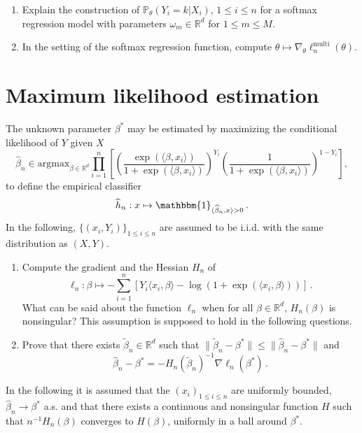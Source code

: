 \documentclass[a4paper,10pt,fleqn]{article}
\newcommand{\eqsp}{\,}
\newcommand{\rset}{\ensuremath{\mathbb{R}}}
\newcommand{\1}{\ensuremath{\mathbbm{1}}}
\begin{document}
\begin{enumerate}
\item Explain the construction of $\mathbb{P}_{\theta}(Y_i = k | X_i)$, $1\leqslant i\leqslant n$ for a softmax regression model with parameters $\omega_m\in\mathbb{R}^d$ for $1\leqslant m  \leqslant M$.
\item In the setting  of the softmax regression function, compute $\theta \mapsto \nabla_\theta \ell^{\mathrm{multi}}_n(\theta)$.
\end{enumerate}


\section{Maximum likelihood estimation}
The unknown parameter $\beta^*$ may be estimated  by maximizing the conditional likelihood of $Y$ given $X$
$$
\widehat \beta_n\in\mathrm{argmax}_{\beta\in\mathbb{R}^{d}}
\prod_{i=1}^n \left[ \left( \frac{\exp\left(\langle
	\beta,x_{i}\rangle\right)}{1+\exp\left(\langle
	\beta,x_{i}\rangle\right)}\right)^{Y_{i}}
\left(\frac{1}{1+\exp\left(\langle
	\beta,x_{i}\rangle\right)}\right)^{1- Y_{i}} \right] ,
$$
to define the empirical classifier
$$
\widehat h_{n}: x \mapsto \1_{\langle \widehat\beta_n,x\rangle>0}\eqsp.
$$
In the following, $\{(x_i,Y_i)\}_{1\leqslant i\leqslant n}$ are assumed to be i.i.d. with the same distribution as $(X,Y)$.
\begin{enumerate}
\item Compute the gradient and the Hessian $H_{n}$ of
$$
\ell_{n}:\beta \mapsto -\sum_{i=1}^n\left[Y_{i}\langle x_{i},\beta\rangle-\log(1+\exp(\langle x_{i},\beta\rangle))\right]\eqsp.
$$
What can be said about the function $\ell_{n}$ when for all $\beta\in\rset^d$, $H_{n}(\beta)$ is nonsingular? This assumption is supposed to hold in the following questions.
\item Prove that there exists $\widetilde \beta_n\in\rset^d$ such that $\|\widetilde \beta_n-\beta^*\|\leq \|\widehat \beta_n-\beta^*\|$ and
$$
\widehat \beta_n-\beta^*=-H_{n}(\widetilde \beta_n)^{-1}\nabla \ell_{n}(\beta^*)\eqsp.
$$
\end{enumerate}
In the following it is assumed that the $(x_{i})_{1\leqslant i\leqslant n}$ are uniformly bounded, $\widehat \beta_n\to \beta^*$ a.s. and that there exists a continuous and nonsingular function $H$ such that $n^{-1}H_{n}(\beta)$ converges to $H(\beta)$, uniformly in a ball around $\beta^*$.
\end{document}
